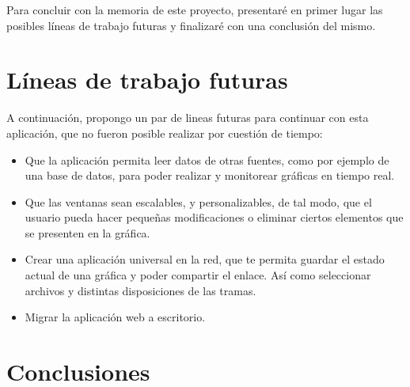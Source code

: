 
Para concluir con la memoria de este proyecto, presentaré en primer lugar las posibles líneas de trabajo futuras y finalizaré con una conclusión del mismo.

\section{Líneas de trabajo futuras}
A continuación, propongo un par de lineas futuras para continuar con esta aplicación, que no fueron posible realizar por cuestión de tiempo:
\begin{itemize}
	\item Que la aplicación permita leer datos de otras fuentes, como por ejemplo de una base de datos, para poder realizar y monitorear gráficas en tiempo real.
	\item Que las ventanas sean escalables, y personalizables, de tal modo, que el usuario pueda hacer pequeñas modificaciones o eliminar ciertos elementos que se presenten en la gráfica.
	\item Crear una aplicación universal en la red, que te permita guardar el estado actual de una gráfica y poder compartir el enlace. Así como seleccionar archivos y distintas disposiciones de las tramas.
	\item Migrar la aplicación web a escritorio.
\end{itemize}

\section{Conclusiones}

